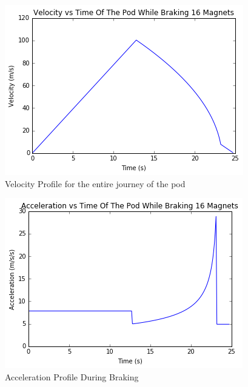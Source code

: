 \documentclass[main.tex]{subfiles}
\begin{document}
    \begin{figure}
        \centering
        \includegraphics[width=\linewidth]{images/totalvelocityprofile}
        \caption{Velocity Profile for the entire journey of the pod}
        \label{fig:total-velocity-profile}
    \end{figure}
    \begin{figure}
        \centering
        \includegraphics[width=\linewidth]{images/totalaccelerationprofile}
        \caption{Acceleration Profile During Braking}
        \label{fig:total-accelation-profile}
    \end{figure} 
\end{document}
